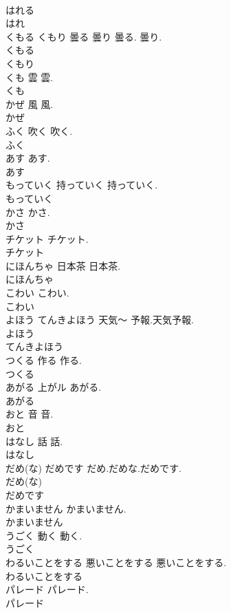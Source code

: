 \documentclass[8pt]{extreport}
\begin{document}
\begin{CJK}{UTF8}{min}
\\	はれる
\\	はれ
\\	くもる くもり	曇る 曇り	曇る. 曇り.	
\\	くもる
\\	くもり
\\	くも	雲	雲.	
\\	くも
\\	かぜ	風	風.	
\\	かぜ
\\	ふく	吹く	吹く.	
\\	ふく
\\	あす		あす.	
\\	あす
\\	もっていく	持っていく	持っていく.	
\\	もっていく
\\	かさ		かさ.	
\\	かさ
\\	チケット		チケット.	
\\	チケット
\\	にほんちゃ	日本茶	日本茶.	
\\	にほんちゃ
\\	こわい		こわい.	
\\	こわい
\\	よほう てんきよほう	天気～	予報.天気予報.	
\\	よほう
\\	てんきよほう
\\	つくる	作る	作る.	
\\	つくる
\\	あがる	上がル	あがる.	
\\	あがる
\\	おと	音	音.	
\\	おと
\\	はなし	話	話.	
\\	はなし
\\	だめ(な) だめです		だめ.だめな.だめです.	
\\	だめ(な)
\\	だめです
\\	かまいません		かまいません.	
\\	かまいません
\\	うごく	動く	動く.	
\\	うごく
\\	わるいことをする	悪いことをする	悪いことをする.	
\\	わるいことをする
\\	パレード		パレード.	
\\	パレード

\end{CJK}
\end{document}
